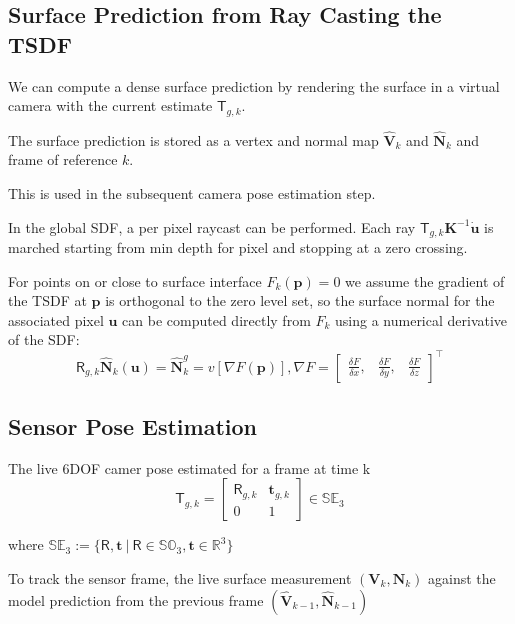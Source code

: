 \documentclass[10pt,twocolumn]{article}
\begin{document}
\subsection{Surface Prediction from Ray Casting the TSDF}
We can compute a dense surface prediction by rendering the surface in a virtual camera with the current estimate $\mathsf{T}_{g,k}$. 

The surface prediction is stored as a vertex and normal map $\hat{\mathbf{V}}_{k}$ and $\hat{\mathbf{N}}_{k}$ and frame of reference $k$.

This is used in the subsequent camera pose estimation step.

In the global SDF, a per pixel raycast can be performed. Each ray $\mathsf{T}_{g,k}\mathbf{K}^{-1}\mathbf{\dot{u}}$ is marched starting from min depth for pixel and stopping at a zero crossing.

For points on or close to surface interface $F_{k}(\mathbf{p}) = 0$ we assume the gradient of the TSDF at $\mathbf{p}$ is orthogonal to the zero level set, so the surface normal for the associated pixel $\mathbf{u}$ can be computed directly from $F_{k}$ using a numerical derivative of the SDF:
$$
\mathsf{R}_{g,k} \mathbf{\hat{N}}_{k} (\mathbf{u}) = \mathbf{\hat{N}}^{g}_{k} = v[\nabla F(\mathbf{p})], \nabla F = 
\begin{bmatrix}
    \frac{\delta F}{\delta x}, & \frac{\delta F}{\delta y}, & \frac{\delta F}{\delta z}
\end{bmatrix}^{\top}
$$


\subsection{Sensor Pose Estimation}
The live 6DOF camer pose estimated for a frame at time k
$$
\mathsf{T}_{g,k} = 
\begin{bmatrix}
  \mathsf{R}_{g,k} & \mathbf{t}_{g,k} \\
  0 & 1
\end{bmatrix}
\in \mathbb{SE}_{3}
$$

where $\mathbb{SE}_{3} := \{\mathsf{R}, \mathbf{t}\ |\ \mathsf{R} \in \mathbb{SO}_{3}, \mathbf{t} \in \mathbb{R}^{3}\}$

\hfill \break

To track the sensor frame, the live surface measurement $(\mathbf{V}_{k}, \mathbf{N}_{k})$ against the model prediction from the previous frame $(\mathbf{\hat{V}}_{k-1}, \mathbf{\hat{N}}_{k-1})$
\end{document}

